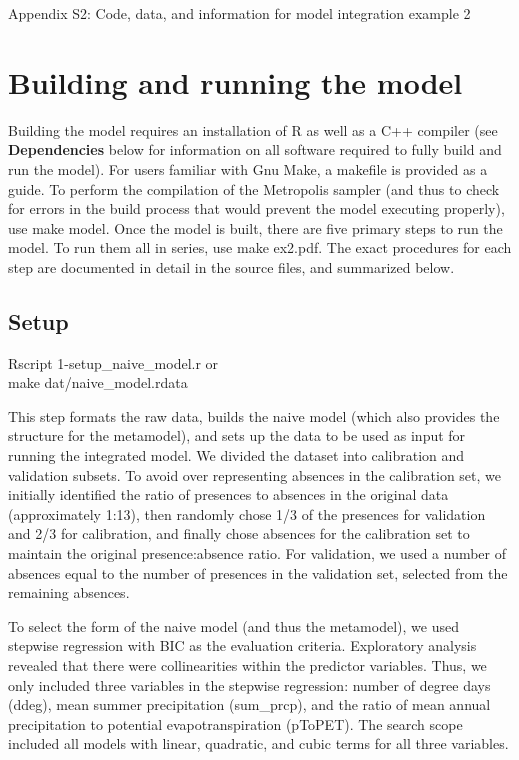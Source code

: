 \documentclass[11pt]{article}
\newcommand{\code}[1]{\colorbox{light-gray}{\ttfamily #1}}
\begin{document}
%
%


%
%

{\Large \flushleft
Appendix S2: Code, data, and information for model integration example 2
}

\section{Building and running the model}
Building the model requires an installation of R as well as a C++ compiler (see \textbf{Dependencies} below for information on all software required to fully build and run the model).
For users familiar with Gnu Make, a makefile is provided as a guide. To perform the compilation of the Metropolis sampler (and thus to check for errors in the build process that would prevent the model executing properly), use \code{make model}. Once the model is built, there are five primary steps to run the model. To run them all in series, use \code{make ex2.pdf}. The exact procedures for each step are documented in detail in the source files, and summarized below.

\subsection{Setup}
\code{Rscript 1-setup\_naive\_model.r} or \\
\code{make dat/naive\_model.rdata}

This step formats the raw data, builds the naive model (which also provides the structure for the metamodel), and sets up the data to be used as input for running the integrated model.
We divided the dataset into calibration and validation subsets.
To avoid over representing absences in the calibration set, we initially identified the ratio of presences to absences in the original data (approximately 1:13), then randomly chose 1/3 of the presences for validation and 2/3 for calibration, and finally chose absences for the calibration set to maintain the original presence:absence ratio.
For validation, we used a number of absences equal to the number of presences in the validation set, selected from the remaining absences. 

To select the form of the naive model (and thus the metamodel), we used stepwise regression with BIC as the evaluation criteria.
Exploratory analysis revealed that there were collinearities within the predictor variables.
Thus, we only included three variables in the stepwise regression: number of degree days (\code{ddeg}), mean summer precipitation (\code{sum\_prcp}), and the ratio of mean annual precipitation to potential evapotranspiration (\code{pToPET}).
The search scope included all models with linear, quadratic, and cubic terms for all three variables.
\end{document}
